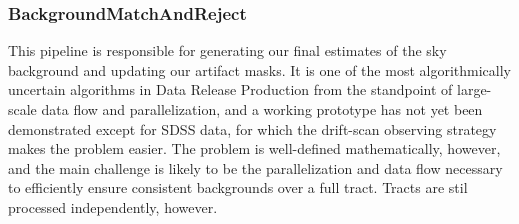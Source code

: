 \subsubsection{BackgroundMatchAndReject}
\label{sec:drpBackgroundMatchAndReject}

This pipeline is responsible for generating our final estimates of the sky background and updating our artifact masks.  It is one of the most algorithmically uncertain algorithms in Data Release Production from the standpoint of large-scale data flow and parallelization, and a working prototype has not yet been demonstrated except for SDSS data, for which the drift-scan observing strategy makes the problem easier.  The problem is well-defined mathematically, however, and the main challenge is likely to be the parallelization and data flow necessary to efficiently ensure consistent backgrounds over a full tract.  Tracts are stil processed independently, however.

